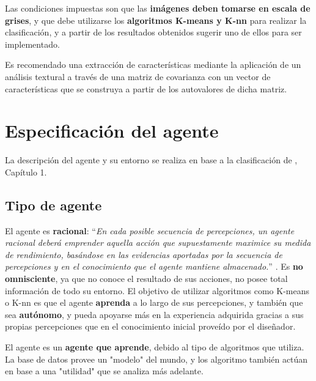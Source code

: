 \documentclass[10pt,a4paper]{article}
\begin{document}
Las condiciones impuestas son que las \textbf{imágenes deben tomarse en escala de grises}, y que debe utilizarse los \textbf{algoritmos K-means y K-nn} para realizar la clasificación, y a partir de los resultados obtenidos sugerir uno de ellos para ser implementado.

Es recomendado una extracción de características mediante la aplicación de un análisis textural a través de una matriz de covarianza con un vector de características que se construya a partir de los autovalores de dicha matriz.

\section{Especificación del agente}
La descripción del agente y su entorno se realiza en base a la clasificación de \textcite{rusellnorving}, Capítulo 1.

\subsection{Tipo de agente}
El agente es \textbf{racional}: ``\textit{En cada posible secuencia de percepciones, un agente racional deberá emprender aquella acción que supuestamente maximice su medida de rendimiento, basándose en las evidencias aportadas por la secuencia de percepciones y en el conocimiento que el agente mantiene almacenado.}'' \textcite{rusellnorving}. Es \textbf{no omnisciente}, ya que no conoce el resultado de sus acciones, no posee total información de todo su entorno. El objetivo de utilizar algoritmos como K-means o K-nn es que el agente \textbf{aprenda} a lo largo de sus percepciones, y también que sea \textbf{autónomo}, y pueda apoyarse más en la experiencia adquirida gracias a sus propias percepciones que en el conocimiento inicial proveído por el diseñador.

El agente es un \textbf{agente que aprende}, debido al tipo de algoritmos que utiliza. La base de datos provee un "modelo" del mundo, y los algoritmo también actúan en base a una "utilidad" que se analiza más adelante.
\end{document}
